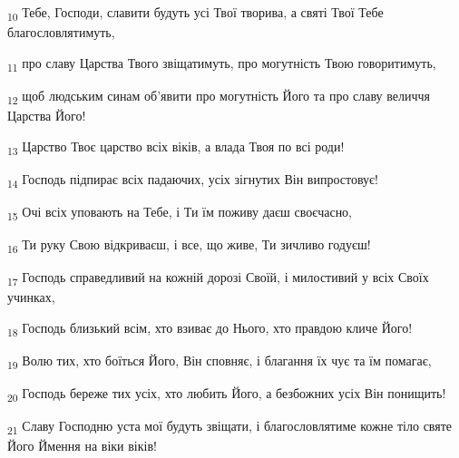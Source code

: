 \begin{tcolorbox}
\textsubscript{10} Тебе, Господи, славити будуть усі Твої творива, а святі Твої Тебе благословлятимуть,
\end{tcolorbox}
\begin{tcolorbox}
\textsubscript{11} про славу Царства Твого звіщатимуть, про могутність Твою говоритимуть,
\end{tcolorbox}
\begin{tcolorbox}
\textsubscript{12} щоб людським синам об'явити про могутність Його та про славу величчя Царства Його!
\end{tcolorbox}
\begin{tcolorbox}
\textsubscript{13} Царство Твоє царство всіх віків, а влада Твоя по всі роди!
\end{tcolorbox}
\begin{tcolorbox}
\textsubscript{14} Господь підпирає всіх падаючих, усіх зігнутих Він випростовує!
\end{tcolorbox}
\begin{tcolorbox}
\textsubscript{15} Очі всіх уповають на Тебе, і Ти їм поживу даєш своєчасно,
\end{tcolorbox}
\begin{tcolorbox}
\textsubscript{16} Ти руку Свою відкриваєш, і все, що живе, Ти зичливо годуєш!
\end{tcolorbox}
\begin{tcolorbox}
\textsubscript{17} Господь справедливий на кожній дорозі Своїй, і милостивий у всіх Своїх учинках,
\end{tcolorbox}
\begin{tcolorbox}
\textsubscript{18} Господь близький всім, хто взиває до Нього, хто правдою кличе Його!
\end{tcolorbox}
\begin{tcolorbox}
\textsubscript{19} Волю тих, хто боїться Його, Він сповняє, і благання їх чує та їм помагає,
\end{tcolorbox}
\begin{tcolorbox}
\textsubscript{20} Господь береже тих усіх, хто любить Його, а безбожних усіх Він понищить!
\end{tcolorbox}
\begin{tcolorbox}
\textsubscript{21} Славу Господню уста мої будуть звіщати, і благословлятиме кожне тіло святе Його Ймення на віки віків!
\end{tcolorbox}
